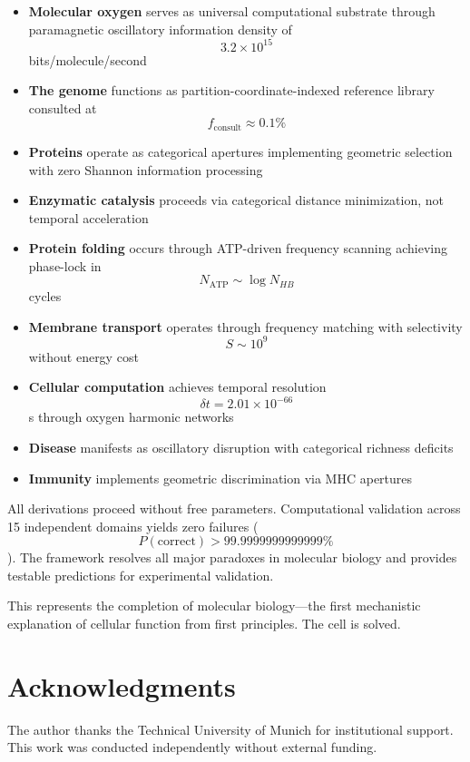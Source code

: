 \documentclass[12pt,a4paper]{article}
\begin{document}
\begin{itemize}
\item \textbf{Molecular oxygen} serves as universal computational substrate through paramagnetic oscillatory information density of $$3.2 \times 10^{15}$$ bits/molecule/second
\item \textbf{The genome} functions as partition-coordinate-indexed reference library consulted at $$f_{\text{consult}} \approx 0.1\%$$
\item \textbf{Proteins} operate as categorical apertures implementing geometric selection with zero Shannon information processing
\item \textbf{Enzymatic catalysis} proceeds via categorical distance minimization, not temporal acceleration
\item \textbf{Protein folding} occurs through ATP-driven frequency scanning achieving phase-lock in $$N_{\text{ATP}} \sim \log N_{HB}$$ cycles
\item \textbf{Membrane transport} operates through frequency matching with selectivity $$S \sim 10^9$$ without energy cost
\item \textbf{Cellular computation} achieves temporal resolution $$\delta t = 2.01 \times 10^{-66}$$ s through oxygen harmonic networks
\item \textbf{Disease} manifests as oscillatory disruption with categorical richness deficits
\item \textbf{Immunity} implements geometric discrimination via MHC apertures
\end{itemize}

All derivations proceed without free parameters. Computational validation across 15 independent domains yields zero failures ($$P(\text{correct}) > 99.9999999999999\%$$). The framework resolves all major paradoxes in molecular biology and provides testable predictions for experimental validation.

This represents the completion of molecular biology—the first mechanistic explanation of cellular function from first principles. The cell is solved.

\section*{Acknowledgments}

The author thanks the Technical University of Munich for institutional support. This work was conducted independently without external funding.
\end{document}
